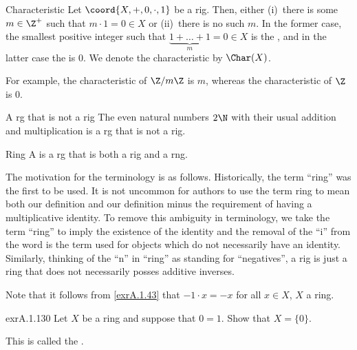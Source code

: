 \begin{dfn}{Characteristic}{}
Let $\coord{X,+,0,\cdot ,1}$ be a rig.  Then, either (i)~there is some $m\in \Z ^+$ such that $m\cdot 1=0\in X$ or (ii)~there is no such $m$.  In the former case, the smallest positive integer such that $\underbrace{1+\dots +1}_m=0\in X$ is the , and in the latter case the  is $0$.  We denote the characteristic by $\Char (X)$.
\begin{rmk}
For example, the characteristic of $\Z /m\Z$ is $m$, whereas the characteristic of $\Z$ is $0$.
\end{rmk}
\end{dfn}
\begin{exm}{A rg that is not a rig}{}
The even natural numbers $2\N$ with their usual addition and multiplication is a rg that is not a rig.
\end{exm}
\begin{dfn}{Ring}{}
A  is a rg that is both a rig and a rng.
\begin{rmk}
The motivation for the terminology is as follows.  Historically, the term ``ring'' was the first to be used.  It is not uncommon for authors to use the term ring to mean both our definition and our definition minus the requirement of having a multiplicative identity.  To remove this ambiguity in terminology, we take the term ``ring'' to imply the existence of the identity and the removal of the ``i'' from the word is the term used for objects which do not necessarily have an identity.  Similarly, thinking of the ``n'' in ``ring'' as standing for ``negatives'', a rig is just a ring that does not necessarily posses additive inverses.
\end{rmk}
\begin{rmk}
Note that it follows from \cref{exrA.1.43} that $-1\cdot x=-x$ for all $x\in X$, $X$ a ring.
\end{rmk}
\end{dfn}
\begin{exr}{}{exrA.1.130}
Let $X$ be a ring and suppose that $0=1$.  Show that $X=\{ 0\}$.
\begin{rmk}
This is called the .
\end{rmk}
\end{exr}
